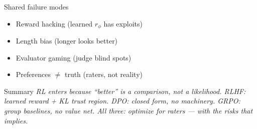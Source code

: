 \documentclass[aspectratio=169,11pt]{beamer}
\begin{document}
\begin{frame}{Shared failure modes}
\begin{itemize}
\item Reward hacking (learned $r_\phi$ has exploits)
\item Length bias (longer looks better)
\item Evaluator gaming (judge blind spots)
\item Preferences $\neq$ truth (raters, not reality)
\end{itemize}
\end{frame}
\begin{frame}{Summary}
\emph{RL enters because ``better'' is a comparison, not a likelihood. RLHF: learned reward + KL trust region. DPO: closed form, no machinery. GRPO: group baselines, no value net. All three: optimize for raters --- with the risks that implies.}
\end{frame}
\end{document}
